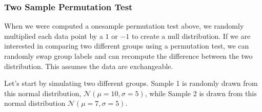 \documentclass[letterpaper,10pt,english]{sphinxmanual}
\begin{document}
\subsubsection{Two Sample Permutation Test}
\label{\detokenize{content/Resampling_Statistics:two-sample-permutation-test}}
When we were computed a one\sphinxhyphen{}sample permutation test above, we randomly multiplied each data point by a \(1\) or \(-1\) to create a null distribution. If we are interested in comparing two different groups using a permutation test, we can randomly swap group labels and can recompute the difference between the two distribution. This assumes the data are exchangeable.

Let’s start by simulating two different groups. Sample 1 is randomly drawn from this normal distribution, \(\mathcal{N}(\mu=10, \sigma=5)\), while Sample 2 is drawn from this normal distribution \(\mathcal{N}(\mu=7, \sigma=5)\).
\end{document}

